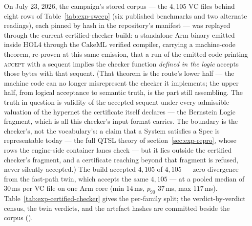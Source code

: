 On July 23, 2026, the campaign's stored corpus --- the $4{,}105$
VC files behind eight rows of Table~\ref{tab:exp-sweep} (six
published benchmarks and two alternate readings), each pinned by
hash in the repository's manifest --- was replayed through the
current certified-checker build: a standalone Arm binary emitted
inside HOL4 through the CakeML verified compiler, carrying a
machine-code theorem, re-proven at this same emission, that a run of
the emitted code printing \textsc{accept} with a sequent implies the
checker function \emph{defined in the logic} accepts those bytes with
that sequent. (That theorem is the route's lower half --- the machine
code can no longer misrepresent the checker it implements; the upper
half, from logical acceptance to semantic truth, is the part still
assembling. The truth in question is validity of the accepted sequent
under every admissible valuation of the hypernet the certificate
itself declares --- the Bernstein Logic fragment, which is all this
checker's input format carries. The boundary is the checker's, not
the vocabulary's: a claim that a System satisfies a Spec is
representable today --- the full QTSL theory of
section~\ref{sec:exp-repro}, whose rows the engine-side container
lanes check --- but it lies outside the certified checker's fragment,
and a certificate reaching beyond that fragment is refused, never
silently accepted.)
The build accepted $4{,}105$ of $4{,}105$ --- zero
divergence from the fast-path twin, which accepts the same $4{,}105$
--- at a pooled median of $30$\,ms per VC file on one Arm core
(min $14$\,ms, $p_{90}$ $37$\,ms, max $117$\,ms).
Table~\ref{tab:exp-certified-checker} gives the per-family split; the
verdict-by-verdict census, the twin verdicts, and the artefact hashes
are committed beside the corpus
().

\begin{table}[htbp]
\centering\small

\caption{The stored corpus of VC files replayed through the certified
checker build (July 23, 2026). ``Accepted'' is the certified binary's
accepts over the family's stored VC files; ``diverging'' counts
VC files on which the certified build's verdict differs from the
untrusted fast-path twin's --- zero everywhere, which \emph{is} the
finding. Walls are single-shot, one single-threaded checker process
per VC file, four families run concurrently; a serial spot sample
ran $10$--$50$\,ms, so the concurrency inflates the walls mildly at
most.}
\label{tab:exp-certified-checker}
\end{table}

